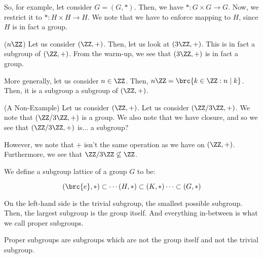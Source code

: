 \documentclass[openany]{book}
\begin{document}
So, for example, let consider $G = (G, *)$. Then, we have $* : G \times G \rightarrow G$. Now, we restrict it to $* : H \times H \rightarrow H$. We note that we have to enforce mapping to $H$, since $H$ is in fact a group.

\begin{example}($n\ZZ$)
	Let us consider $(\ZZ, +)$. Then, let us look at $(3\ZZ, +)$. This is in fact a subgroup of $(\ZZ, +)$. From the warm-up, we see that $(3\ZZ, +)$ is in fact a group.
	
	More generally, let us consider $n \in \ZZ$. Then, $n\ZZ = \brc{k \in \ZZ : n \mid k}$. Then, it is a subgroup a subgroup of $(\ZZ, +)$.
\end{example}

\begin{example}(A Non-Example)
	Let us consider $(\ZZ, +)$. Let us consider $(\ZZ/3\ZZ, +)$. We note that $(\ZZ/3\ZZ, +)$ is a group. We also note that we have closure, and so we see that $(\ZZ/3\ZZ, +)$ is... a subgroup?
	
	However, we note that $+$ isn't the same operation as we have on $(\ZZ, +)$. Furthermore, we see that $\ZZ/3\ZZ \not\subseteq \ZZ$.
\end{example}

\begin{defn}
	We define a subgroup lattice of a group $G$ to be:
	
	\begin{equation*}
		(\brc{e}, *) \subset \cdots (H, *) \subset (K, *) \cdots \subset (G, *)
	\end{equation*}

	On the left-hand side is the trivial subgroup, the smallest possible subgroup. Then, the largest subgroup is the group itself. And everything in-between is what we call proper subgroups.
\end{defn}

\begin{defn}
	Proper subgroups are subgroups which are not the group itself and not the trivial subgroup.
\end{defn}
\end{document}
